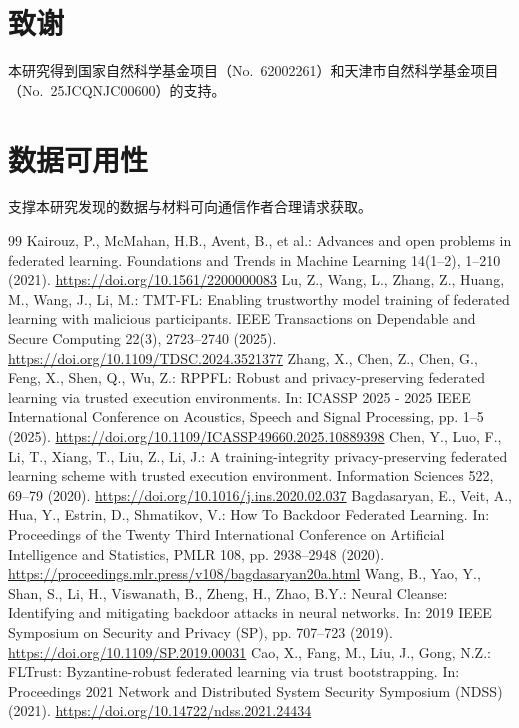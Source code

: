 \documentclass[11pt, a4paper, UTF8, fontset=fandol]{ctexart}
\begin{document}
\section*{致谢}
本研究得到国家自然科学基金项目（No.~62002261）和天津市自然科学基金项目（No.~25JCQNJC00600）的支持。

\section*{数据可用性}
支撑本研究发现的数据与材料可向通信作者合理请求获取。

\begin{thebibliography}{99}
     Kairouz, P., McMahan, H.B., Avent, B., et al.: Advances and open problems in federated learning. Foundations and Trends in Machine Learning 14(1--2), 1--210 (2021). \url{https://doi.org/10.1561/2200000083}
     Lu, Z., Wang, L., Zhang, Z., Huang, M., Wang, J., Li, M.: TMT-FL: Enabling trustworthy model training of federated learning with malicious participants. IEEE Transactions on Dependable and Secure Computing 22(3), 2723--2740 (2025). \url{https://doi.org/10.1109/TDSC.2024.3521377}
     Zhang, X., Chen, Z., Chen, G., Feng, X., Shen, Q., Wu, Z.: RPPFL: Robust and privacy-preserving federated learning via trusted execution environments. In: ICASSP 2025 - 2025 IEEE International Conference on Acoustics, Speech and Signal Processing, pp. 1--5 (2025). \url{https://doi.org/10.1109/ICASSP49660.2025.10889398}
     Chen, Y., Luo, F., Li, T., Xiang, T., Liu, Z., Li, J.: A training-integrity privacy-preserving federated learning scheme with trusted execution environment. Information Sciences 522, 69--79 (2020). \url{https://doi.org/10.1016/j.ins.2020.02.037}
     Bagdasaryan, E., Veit, A., Hua, Y., Estrin, D., Shmatikov, V.: How To Backdoor Federated Learning. In: Proceedings of the Twenty Third International Conference on Artificial Intelligence and Statistics, PMLR 108, pp. 2938--2948 (2020). \url{https://proceedings.mlr.press/v108/bagdasaryan20a.html}
     Wang, B., Yao, Y., Shan, S., Li, H., Viswanath, B., Zheng, H., Zhao, B.Y.: Neural Cleanse: Identifying and mitigating backdoor attacks in neural networks. In: 2019 IEEE Symposium on Security and Privacy (SP), pp. 707--723 (2019). \url{https://doi.org/10.1109/SP.2019.00031}
     Cao, X., Fang, M., Liu, J., Gong, N.Z.: FLTrust: Byzantine-robust federated learning via trust bootstrapping. In: Proceedings 2021 Network and Distributed System Security Symposium (NDSS) (2021). \url{https://doi.org/10.14722/ndss.2021.24434}

\end{thebibliography}
\end{document}

